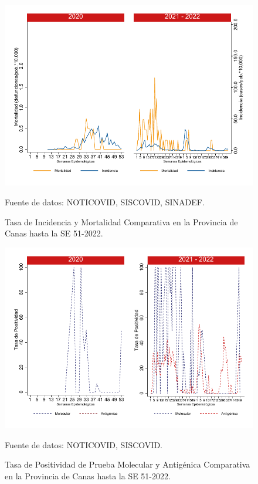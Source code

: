 \documentclass[12pt,a4paper,openany]{book}
\begin{document}
	
	\begin{figure}[h]
		\caption{Tasa de Incidencia y Mortalidad Comparativa en la Provincia de Canas hasta la SE 51-2022.}\label{fig:inc_mort_canas}
		\begin{center}
			\includegraphics[width=0.85\linewidth]{../figuras/incidencia_mortalidad_20_21_4.pdf}
		\end{center}
		{\footnotesize {Fuente de datos: NOTICOVID, SISCOVID, SINADEF.}}
	\end{figure}
	
	\begin{figure}[h]
		\caption{Tasa de Positividad de Prueba Molecular y Antigénica Comparativa en la Provincia de Canas hasta la SE 51-2022.}\label{fig:positividad_canas}
		\begin{center}
			\includegraphics[width=0.7\linewidth]{../figuras/positividad_20_21_4.pdf}
		\end{center}
		{\footnotesize {Fuente de datos: NOTICOVID, SISCOVID.}}
	\end{figure}
	
\end{document}
